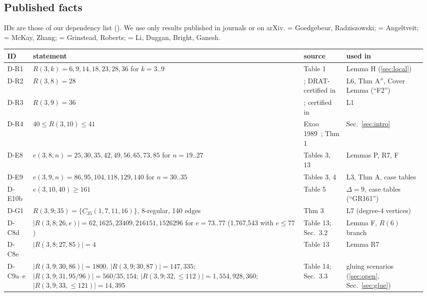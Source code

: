 \subsection{Published facts}\label{sec:pub}
IDs are those of our dependency list (). We use only results published in journals or
on arXiv. \cite{GR} = Goedgebeur, Radziszowski; \cite{Ang} = Angeltveit;
\cite{McZ} = McKay, Zhang; \cite{GrR} = Grinstead, Roberts;
\cite{DuLBG} = Li, Duggan, Bright, Ganesh.

\begin{center}\small
\begin{tabular}{@{}l p{6.4cm} p{3.4cm} p{2.6cm}@{}}
\toprule
ID & statement & source & used in \\
\midrule
D-R1 & $R(3,k) = 6, 9, 14, 18, 23, 28, 36$ for $k = 3..9$ & \cite{GR} Table 1 & Lemma H (\ref{sec:local}) \\
D-R2 & $R(3,8) = 28$ & \cite{McZ}; DRAT-certified in \cite{DuLBG} & L6, Thm A$''$, Cover Lemma (``F2'') \\
D-R3 & $R(3,9) = 36$ & \cite{GrR}; certified in \cite{DuLBG} & L1 \\
D-R4 & $40 \le R(3,10) \le 41$ & Exoo 1989~\cite{Ex89}; \cite{Ang} Thm 1 & Sec.~\ref{sec:intro} \\
D-E8 & $e(3,8,n) = 25, 30, 35, 42, 49, 56, 65, 73, 85$ for $n = 19..27$ & \cite{GR} Tables 3, 13 & Lemmas P, R7, F \\
D-E9 & $e(3,9,n) = 86, 95, 104, 118, 129, 140$ for $n = 30..35$ & \cite{GR} Tables 3, 4 & L3, Thm A, case tables \\
D-E10b & $e(3,10,40) \ge 161$ & \cite{GR} Table 5 & $\Delta = 9$, case tables (``GR161'') \\
D-G1 & $R(3,9;35) = \{C_{35}(1,7,11,16)\}$, 8-regular, 140 edges & \cite{GR} Thm 3 & L7 (degree-4 vertices) \\
D-C8d & $|R(3,8;26,e)| = 62, 1625, 23409, 216151, 1526296$ for $e = 73..77$ (1,767,543 with $e \le 77$) & \cite{GR} Table 13; \cite{Ang} Sec.~3.2 & Lemma F, $R(6)$ branch \\
D-C8e & $|R(3,8;27,85)| = 4$ & \cite{GR} Table 13 & Lemma R7 \\
D-C9a--e & $|R(3,9;30,86)| = 1800$, $|R(3,9;30,87)| = 147{,}335$; $|R(3,9;31,95/96)| = 560 / 35{,}154$; $|R(3,9;32,{\le}112)| = 1{,}554{,}928{,}360$; $|R(3,9;33,{\le}121)| = 14{,}395$ & \cite{GR} Table 14; \cite{Ang} Sec.~3.3 & gluing scenarios (\ref{sec:open}, Sec.~\ref{sec:glue}) \\
\bottomrule
\end{tabular}
\end{center}


